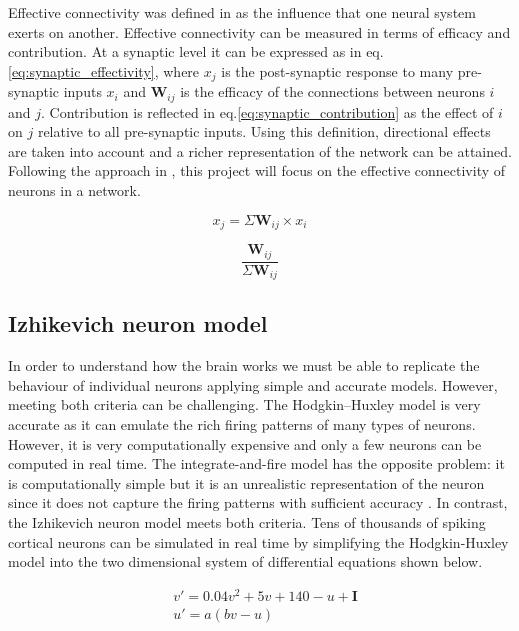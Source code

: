 \documentclass{article}
\begin{document}
Effective connectivity was defined in \cite{friston1993functional} as the influence that one neural system exerts on another. Effective connectivity can be measured in terms of efficacy and contribution. At a synaptic level it can be expressed as in eq.\ref{eq:synaptic_effectivity}, where $x_{j}$ is the post-synaptic response to many pre-synaptic inputs $x_{i}$ and $\textbf{W}_{ij}$ is the efficacy of the connections between neurons $i$ and $j$. Contribution is reflected in eq.\ref{eq:synaptic_contribution} as the effect of $i$ on $j$ relative to all pre-synaptic inputs. Using this definition, directional effects are taken into account and a richer representation of the network can be attained. Following the approach in \cite{alexandru2018estimating}, this project will focus on the effective connectivity of neurons in a network.


\begin{equation}\label{eq:synaptic_effectivity}
x_{j} = \Sigma \textbf{W}_{ij}\times x_{i}
\end{equation}

\begin{equation}\label{eq:synaptic_contribution}
\frac{\textbf{W}_{ij}}{\Sigma \textbf{W}_{ij}}
\end{equation}

\subsection{Izhikevich neuron model}

In order to understand how the brain works we must be able to replicate the behaviour of individual neurons applying simple and accurate models. However, meeting both criteria can be challenging. The Hodgkin–Huxley model \cite{hodgkin1952quantitative} is very accurate as it can emulate the rich firing patterns of many types of neurons. However, it is very computationally expensive and only a few neurons can be computed in real time. The integrate-and-fire model has the opposite problem: it is computationally simple but it is an unrealistic representation of the neuron since it does not capture the firing patterns with sufficient accuracy \cite{izhikevich2003simple}.
In contrast, the Izhikevich neuron model \cite{izhikevich2003simple} meets both criteria. Tens of thousands of spiking cortical neurons can be simulated in real time by simplifying the Hodgkin-Huxley model into the two dimensional system of differential equations shown below.


\begin{align}\label{eq:izhikevich_ode}
&v'=0.04v^{2}+5v+140-u+\textbf{I} \\
&u'=a(bv-u)
\end{align}
\end{document}
